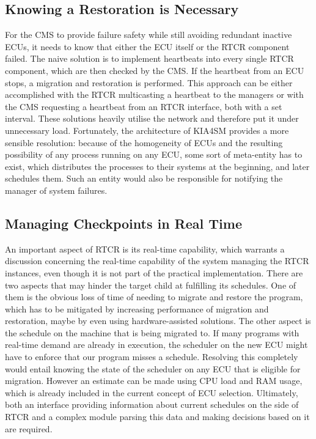 \subsection{Knowing a Restoration is Necessary}
For the CMS to provide failure safety while still avoiding redundant inactive ECUs, it needs to know that either the ECU itself or the RTCR component failed. The naive solution is to implement heartbeats into every single RTCR component, which are then checked by the CMS. If the heartbeat from an ECU stops, a migration and restoration is performed. This approach can be either accomplished with the RTCR multicasting a heartbeat to the managers or with the CMS requesting a heartbeat from an RTCR interface, both with a set interval. These solutions heavily utilise the network and therefore put it under unnecessary load. Fortunately, the architecture of KIA4SM provides a more sensible resolution: because of the homogeneity of ECUs and the resulting possibility of any process running on any ECU, some sort of meta-entity has to exist, which distributes the processes to their systems at the beginning, and later schedules them. Such an entity would also be responsible for notifying the manager of system failures.

\subsection{Managing Checkpoints in Real Time}
An important aspect of RTCR is its real-time capability, which warrants a discussion concerning the real-time capability of the system managing the RTCR instances, even though it is not part of the practical implementation. There are two aspects that may hinder the target child at fulfilling its schedules. One of them is the obvious loss of time of needing to migrate and restore the program, which has to be mitigated by increasing performance of migration and restoration, maybe by even using hardware-assisted solutions. The other aspect is the schedule on the machine that is being migrated to. If many programs with real-time demand are already in execution, the scheduler on the new ECU might have to enforce that our program misses a schedule. Resolving this completely would entail knowing the state of the scheduler on any ECU that is eligible for migration. However an estimate can be made using CPU load and RAM usage, which is already included in the current concept of ECU selection. Ultimately, both an interface providing information about current schedules on the side of RTCR and a complex module parsing this data and making decisions based on it are required.